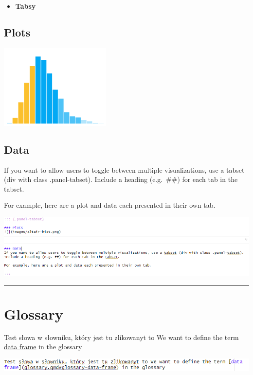 \documentclass[
  a4paper,
  DIV=11,
  numbers=noendperiod,
  oneside,
  open=any]{scrreprt}
\providecommand{\tightlist}{%
  \setlength{\itemsep}{0pt}\setlength{\parskip}{0pt}}\usepackage{longtable,booktabs,array}
\begin{document}
\begin{itemize}
\tightlist
\item
  \textbf{Tabsy}
\end{itemize}

\subsection{Plots}

\includegraphics{images/altair-hist.png}

\subsection{Data}

If you want to allow users to toggle between multiple visualizations,
use a tabset (div with class .panel-tabset). Include a heading
(e.g.~\#\#) for each tab in the tabset.

For example, here are a plot and data each presented in their own tab.

\includegraphics{images/_format_tabset.png}

\begin{center}\rule{0.5\linewidth}{0.5pt}\end{center}

\section{Glossary}\label{glossary}

Test słowa w słowniku, który jest tu zlikowanyt to We want to define the
term \hyperref[glossary-data-frame]{data frame} in the glossary

\includegraphics[width=5.28125in,height=\textheight]{images/_format_glossary.png}
\end{document}
